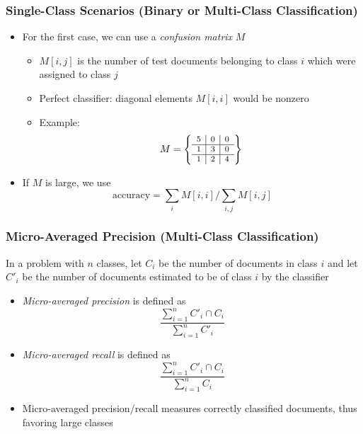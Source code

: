 \documentclass{beamer}
\begin{document}
\begin{frame} \frametitle{Single-Class Scenarios (Binary or Multi-Class Classification)}
  \begin{itemize}
  \item For the first case, we can use a \emph{confusion matrix} $M$
    \begin{itemize}
    \item $M[i,j]$ is the number of test documents belonging to class $i$ which
      were assigned to class $j$
    \item Perfect classifier: diagonal elements $M[i,i]$ would be nonzero
    \item Example:
      \begin{displaymath}
        \footnotesize
        M = \left\{
          \begin{array}{c|c|c}
            5 & 0 & 0 \\\hline
            1 & 3 & 0 \\\hline
            1 & 2 & 4
          \end{array}
        \right\}
      \end{displaymath}
    \end{itemize}
  \item If $M$ is large, we use
    \begin{displaymath}
      \text{accuracy} = \sum_i M[i,i] / \sum_{i,j} M[i,j]
    \end{displaymath}
  \end{itemize}
\end{frame}


\begin{frame} \frametitle{Micro-Averaged Precision (Multi-Class Classification)}
  
  In a problem with $n$ classes, let $C_i$ be the number of documents in class
  $i$ and let $C'_i$ be the number of documents estimated to be of class $i$ by
  the classifier
  \begin{itemize}
  \item \emph{Micro-averaged precision} is defined as
    \begin{displaymath}
      \frac{\sum_{i=1}^n C'_i \cap C_i}{\sum_{i=1}^n C'_i}
    \end{displaymath}
  \item \emph{Micro-averaged recall} is defined as
    \begin{displaymath}
      \frac{\sum_{i=1}^n C'_i \cap C_i}{\sum_{i=1}^n C_i}
    \end{displaymath}
  \end{itemize}
  \begin{itemize}
  \item Micro-averaged precision/recall measures correctly classified
    documents, thus favoring large classes
  \end{itemize}
\end{frame}
\end{document}
